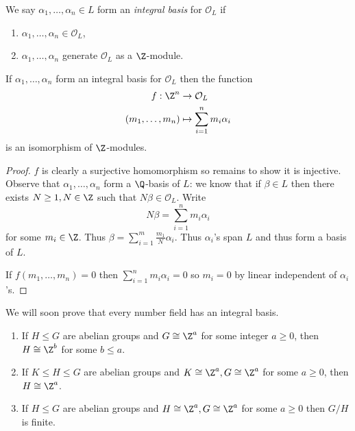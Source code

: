 \documentclass[a4paper]{article}
\renewcommand*{\O}{\mathcal{O}}
\begin{document}
\begin{definition}
  We say \(\alpha_1, \dots, \alpha_n \in L\) form an \emph{integral basis} for \(\O_L\) if
  \begin{enumerate}
  \item \(\alpha_1, \dots, \alpha_n \in \O_L\),
  \item \(\alpha_1, \dots, \alpha_n\) generate \(\O_L\) as a \(\Z\)-module.
  \end{enumerate}
\end{definition}

\begin{lemma}
  If \(\alpha_1, \dots, \alpha_n\) form an integral basis for \(\O_L\) then the function
  \begin{align*}
    f: \Z^n &\to \O_L \\
    (m_1, \dots, m_n) &\mapsto \sum_{i = 1}^n m_i\alpha_i
  \end{align*}
  is an isomorphism of \(\Z\)-modules.
\end{lemma}

\begin{proof}
  \(f\) is clearly a surjective homomorphism so remains to show it is injective. Observe that \(\alpha_1, \dots, \alpha_n\) form a \(\Q\)-basis of \(L\): we know that if \(\beta \in L\) then there exists \(N \geq 1, N \in \Z\) such that \(N\beta \in \O_L\). Write
  \[
    N\beta = \sum_{i = 1}^n m_i\alpha_i
  \]
  for some \(m_i \in \Z\). Thus \(\beta = \sum_{i = 1}^m \frac{m_1}{N} \alpha_i\). Thus \(\alpha_i\)'s span \(L\) and thus form a basis of \(L\).

  If \(f(m_1, \dots, m_n) = 0\) then \(\sum_{i = 1}^n m_i\alpha_i = 0\) so \(m_i = 0\) by linear independent of \(\alpha_i\)'s.
\end{proof}

We will soon prove that every number field has an integral basis.

\begin{lemma}\leavevmode
  \begin{enumerate}
  \item If \(H \leq G\) are abelian groups and \(G \cong \Z^a\) for some integer \(a \geq 0\), then \(H \cong \Z^b\) for some \(b \leq a\).
  \item If \(K \leq H \leq G\) are abelian groups and \(K \cong \Z^a, G \cong \Z^a\) for some \(a \geq 0\), then \(H \cong \Z^a\).
  \item If \(H \leq G\) are abelian groups and \(H \cong \Z^a, G \cong \Z^a\) for some \(a \geq 0\) then \(G/H\) is finite.
  \end{enumerate}
\end{lemma}
\end{document}
